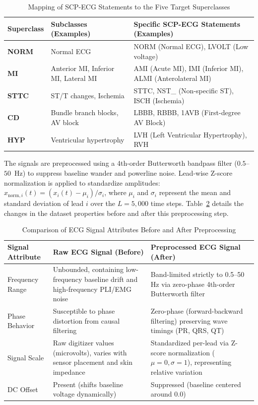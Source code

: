 \documentclass[14pt]{extarticle}
\begin{document}
\begin{table}[H]
\caption{Mapping of SCP-ECG Statements to the Five Target Superclasses}
\label{tab:scp_mapping}
\centering
\begin{tabular}{|l|l|l|}
\hline
\textbf{Superclass} & \textbf{Subclasses (Examples)} & \textbf{Specific SCP-ECG Statements (Examples)} \\
\hline
\textbf{NORM} & Normal ECG & NORM (Normal ECG), LVOLT (Low voltage) \\
\hline
\textbf{MI} & Anterior MI, Inferior MI, Lateral MI & AMI (Acute MI), IMI (Inferior MI), ALMI (Anterolateral MI) \\
\hline
\textbf{STTC} & ST/T changes, Ischemia & STTC, NST\_ (Non-specific ST), ISCH (Ischemia) \\
\hline
\textbf{CD} & Bundle branch blocks, AV block & LBBB, RBBB, 1AVB (First-degree AV Block) \\
\hline
\textbf{HYP} & Ventricular hypertrophy & LVH (Left Ventricular Hypertrophy), RVH \\
\hline
\end{tabular}
\end{table}

The signals are preprocessed using a 4th-order Butterworth bandpass filter ($0.5$--$50$~Hz) to suppress baseline wander and powerline noise. Lead-wise Z-score normalization is applied to standardize amplitudes: $x_{\text{norm}, i}(t) = (x_{i}(t) - \mu_{i}) / \sigma_{i}$, where $\mu_{i}$ and $\sigma_{i}$ represent the mean and standard deviation of lead $i$ over the $L=5{,}000$ time steps. Table~\ref{tab:preprocessing_comparison_caj} details the changes in the dataset properties before and after this preprocessing step.

\begin{table}[H]
\caption{Comparison of ECG Signal Attributes Before and After Preprocessing}
\label{tab:preprocessing_comparison_caj}
\centering
\small
\begin{tabular}{|l|p{6.5cm}|p{6.5cm}|}
\hline
\textbf{Signal Attribute} & \textbf{Raw ECG Signal (Before)} & \textbf{Preprocessed ECG Signal (After)} \\
\hline
Frequency Range & Unbounded, containing low-frequency baseline drift and high-frequency PLI/EMG noise & Band-limited strictly to 0.5–50 Hz via zero-phase 4th-order Butterworth filter \\
\hline
Phase Behavior & Susceptible to phase distortion from causal filtering & Zero-phase (forward-backward filtering) preserving wave timings (PR, QRS, QT) \\
\hline
Signal Scale & Raw digitizer values (microvolts), varies with sensor placement and skin impedance & Standardized per-lead via Z-score normalization ($\mu = 0, \sigma = 1$), representing relative variation \\
\hline
DC Offset & Present (shifts baseline voltage dynamically) & Suppressed (baseline centered around 0.0) \\
\hline
\end{tabular}
\end{table}
\end{document}
